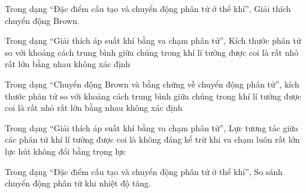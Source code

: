 \begin{ex}
Trong dạng “Đặc điểm cấu tạo và chuyển động phân tử ở thể khí”, Giải thích chuyển động Brown.
\choiceTF

\end{ex}

\begin{ex}
Trong dạng “Giải thích áp suất khí bằng va chạm phân tử”, Kích thước phân tử so với khoảng cách trung bình giữa chúng trong khí lí tưởng được coi là
\choice
{\True rất nhỏ}
{rất lớn}
{bằng nhau}
{không xác định}
\end{ex}

\begin{ex}
Trong dạng “Chuyển động Brown và bằng chứng về chuyển động phân tử”, kích thước phân tử so với khoảng cách trung bình giữa chúng trong khí lí tưởng được coi là
\choice
{\True rất nhỏ}
{rất lớn}
{bằng nhau}
{không xác định}
\end{ex}

\begin{ex}
Trong dạng “Giải thích áp suất khí bằng va chạm phân tử”, Lực tương tác giữa các phân tử khí lí tưởng được coi là
\choice
{\True không đáng kể trừ khi va chạm}
{luôn rất lớn}
{lực hút không đổi}
{bằng trọng lực}
\end{ex}

\begin{ex}
Trong dạng “Đặc điểm cấu tạo và chuyển động phân tử ở thể khí”, So sánh chuyển động phân tử khi nhiệt độ tăng.
\choiceTF

\end{ex}

